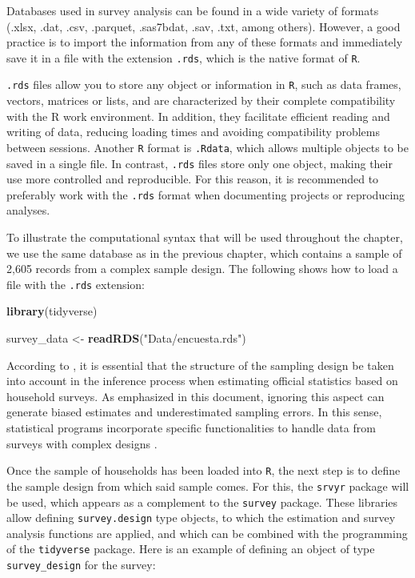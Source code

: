 \documentclass[
  english,
  12pt,
]{book}
\newenvironment{Shaded}{\begin{snugshade}}{\end{snugshade}}
\newcommand{\FunctionTok}[1]{\textcolor[rgb]{0.13,0.29,0.53}{\textbf{#1}}}
\newcommand{\NormalTok}[1]{#1}
\newcommand{\OtherTok}[1]{\textcolor[rgb]{0.56,0.35,0.01}{#1}}
\newcommand{\StringTok}[1]{\textcolor[rgb]{0.31,0.60,0.02}{#1}}
\begin{document}
Databases used in survey analysis can be found in a wide variety of formats (.xlsx, .dat, .csv, .parquet, .sas7bdat, .sav, .txt, among others). However, a good practice is to import the information from any of these formats and immediately save it in a file with the extension \texttt{.rds}, which is the native format of \texttt{R}.

\texttt{.rds} files allow you to store any object or information in \texttt{R}, such as data frames, vectors, matrices or lists, and are characterized by their complete compatibility with the R work environment. In addition, they facilitate efficient reading and writing of data, reducing loading times and avoiding compatibility problems between sessions. Another \texttt{R} format is \texttt{.Rdata}, which allows multiple objects to be saved in a single file. In contrast, \texttt{.rds} files store only one object, making their use more controlled and reproducible. For this reason, it is recommended to preferably work with the \texttt{.rds} format when documenting projects or reproducing analyses.

To illustrate the computational syntax that will be used throughout the chapter, we use the same database as in the previous chapter, which contains a sample of 2,605 records from a complex sample design. The following shows how to load a file with the \texttt{.rds} extension:

\begin{Shaded}
\begin{Highlighting}[]
\FunctionTok{library}\NormalTok{(tidyverse)}

\NormalTok{survey\_data }\OtherTok{\textless{}{-}} \FunctionTok{readRDS}\NormalTok{(}\StringTok{"Data/encuesta.rds"}\NormalTok{)}
\end{Highlighting}
\end{Shaded}

According to \citet[section 7.8]{ONUDeff}, it is essential that the structure of the sampling design be taken into account in the inference process when estimating official statistics based on household surveys. As emphasized in this document, ignoring this aspect can generate biased estimates and underestimated sampling errors. In this sense, statistical programs incorporate specific functionalities to handle data from surveys with complex designs \citep[appendix A]{heeringa2017applied}.

Once the sample of households has been loaded into \texttt{R}, the next step is to define the sample design from which said sample comes. For this, the \texttt{srvyr} \citep{Freedman2024} package will be used, which appears as a complement to the \texttt{survey} \citep{Lumley2024} package. These libraries allow defining \texttt{survey.design} type objects, to which the estimation and survey analysis functions are applied, and which can be combined with the programming of the \texttt{tidyverse} \citep{tidyverse2026} package. Here is an example of defining an object of type \texttt{survey\_design} for the survey:
\end{document}
